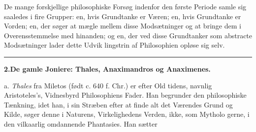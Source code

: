 \documentclass[12pt,a4paper]{book}
\newcommand{\divrule}{\begin{center}\rule{2cm}{0.4pt}\end{center}}
\begin{document}
De mange forskjellige philosophiske Forsøg indenfor den
første Periode samle sig saaledes i fire Grupper: en, hvis
Grundtanke er Væren; en, hvis Grundtanke er Vorden; en,
der søger at mægle mellem disse Modsætninger og at bringe
dem i Overensstemmelse med hinanden; og en, der ved disse
Grundtanker som abstracte Modsætninger lader dette Udvik\-%
lingstrin af Philosophien opløse sig selv.
\divrule
\begin{center}
\textbf{2.\enspace De gamle Joniere: Thales, Anaximandros og Anaximenes.}
\end{center}
a. \emph{Thales} fra Miletos (født c. 640 f. Chr.) er efter Old\-%
tidens, navnlig Aristoteles's, Vidnesbyrd Philosophiens Fader.
Han begrunder den philosophiske Tænkning, idet han, i sin
Stræben efter at finde alt det Værendes Grund og Kilde, søger
denne i Naturens, Virkelighedens Verden, ikke, som Mytholo\-%
gerne, i den vilkaarlig omdannende Phantasies. Han sætter
\end{document}
